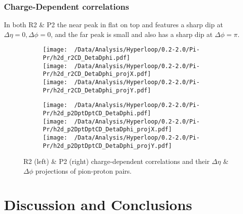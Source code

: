 \documentclass[12pt,a4paper,twoside]{report}
\begin{document}
\subsection{Charge-Dependent correlations}
In both R2 \& P2 the near peak in flat on top and features a sharp dip at $\Delta\eta=0,\Delta\phi=0$, and the far peak is small and also has a sharp dip at $\Delta\phi=\pi$.
\begin{figure}[H]
	\begin{subfigure}{0.49\linewidth}
		\texttt{[image: ~/Data/Analysis/Hyperloop/0.2-2.0/Pi-Pr/h2d\_r2CD\_DetaDphi.pdf]}\\
		\texttt{[image: ~/Data/Analysis/Hyperloop/0.2-2.0/Pi-Pr/h2d\_r2CD\_DetaDphi\_projX.pdf]}\\
		\texttt{[image: ~/Data/Analysis/Hyperloop/0.2-2.0/Pi-Pr/h2d\_r2CD\_DetaDphi\_projY.pdf]}\\
	\end{subfigure}
	\begin{subfigure}{0.49\linewidth}
		\texttt{[image: ~/Data/Analysis/Hyperloop/0.2-2.0/Pi-Pr/h2d\_p2DptDptCD\_DetaDphi.pdf]}\\
		\texttt{[image: ~/Data/Analysis/Hyperloop/0.2-2.0/Pi-Pr/h2d\_p2DptDptCD\_DetaDphi\_projX.pdf]}\\
		\texttt{[image: ~/Data/Analysis/Hyperloop/0.2-2.0/Pi-Pr/h2d\_p2DptDptCD\_DetaDphi\_projY.pdf]}\\
	\end{subfigure}
	\caption{R2 (left) \& P2 (right) charge-dependent correlations and their $\Delta\eta$ \& $\Delta\phi$ projections of pion-proton pairs.}
\end{figure}
\chapter{Discussion and Conclusions}\label{Ch:Conclusions}
\end{document}
